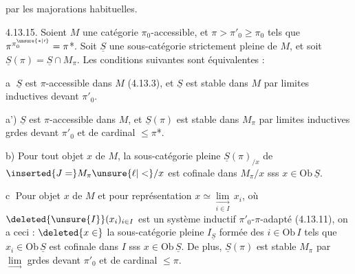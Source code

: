 
par les majorations habituelles.


  4.13.15. Soient $M$ une catégorie $\pi_0$-accessible, et $\pi>\pi'_0\geq\pi_0$ tels que $\pi^{\pi_0^{\unsure{*|\prime}}}=\pi$*. Soit $\underline S$ une sous-catégorie strictement pleine de $M$, et soit $\underline S(\pi)=\underline S\cap M_\pi$. Les conditions suivantes sont équivalentes :


\textcircled{a} $\underline S$ est $\pi$-accessible dans $M$ (4.13.3),  et $\underline S$ est stable dans $M$ par limites inductives   devant $\pi'_0$.

a') $\underline S$ est $\pi$-accessible dans $M$, et $\underline S(\pi)$ est stable dans $M_\pi$ par limites inductives grdes devant $\pi'_0$ et de cardinal $\leq\pi$*.


b) Pour tout objet $x$ de $M$,  la sous-catégorie  pleine $\underline S(\pi)_{/x}$ de $\inserted{J=}M_{\pi}\unsure{\ell|<}/x$ est cofinale dans $M_\pi/x$ sss $x\in\mathrm{Ob}\,\underline S$. 

\textcircled{c} Pour  objet $x$ de $M$ et pour  représentation $x\simeq\underset{i\in I}{\underset{\longrightarrow}{\lim}}\,x_i$, où $\deleted{\unsure{I}}(x_i)_{i\in I}$ est un système inductif $\pi'_0$-$\pi$-adapté (4.13.11), on a ceci : $\deleted{x\in}$ la sous-catégorie  pleine $I_{\underline S}$  formée des $i\in\mathrm{Ob}\,I$ tels que $x_i\in\mathrm{Ob}\,\underline S$ est cofinale dans $I$ sss $x\in\mathrm{Ob}\,\underline S$. De plus, $\underline S(\pi)$ est stable  $M_\pi$ par $\underset{\longrightarrow}{\lim}$ grdes devant $\pi'_0$ et de cardinal $\leq\pi$.

